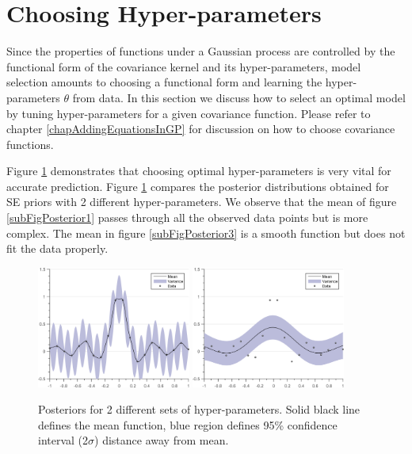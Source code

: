 \section{Choosing Hyper-parameters}\label{secHyperParameter}
Since the properties of functions under a Gaussian process are controlled by the functional form of the covariance kernel and its hyper-parameters, model selection amounts to choosing a functional form and learning the hyper-parameters \(\theta\) from data. In this section we discuss how to select an optimal model by tuning hyper-parameters for a given covariance function. Please refer to chapter \ref{chapAddingEquationsInGP} for discussion on how to choose covariance functions. 

Figure \ref{figGPRMarginal} demonstrates that choosing optimal hyper-parameters is very vital for accurate prediction. Figure  \ref{figGPRMarginal} compares the posterior distributions obtained for SE priors with 2 different hyper-parameters. We observe that the mean of figure \ref{subFigPosterior1} passes through all the observed data points but is more complex. The mean in figure \ref{subFigPosterior3} is a smooth function but does not fit the data properly. 

  \begin{figure}[!ht]
  \centering
    \subfigure[{Posterior between SE prior with hyper-parameters \((\theta = [0.35, 0.05]; \sigma_{noise} = 0.01)\) and data. }]
  {
        \includegraphics[width=0.45\textwidth]
        {images/posteriorSE1}
        \label{subFigPosterior1}
  }\quad
\subfigure[{Posterior between SE prior with hyper-parameters \((\theta = [0.35, 0.5]; \sigma_{noise} = 0.01)\) and data. }]
  {
        \includegraphics[width=0.45\textwidth]
        {images/posteriorSE3}
        \label{subFigPosterior3}
  }\quad
       \caption{Posteriors for 2 different sets of hyper-parameters. Solid black line defines the mean function, blue region defines 95\% confidence interval (2\(\sigma\)) distance away from mean. }\label{figGPRMarginal}
\end{figure}

